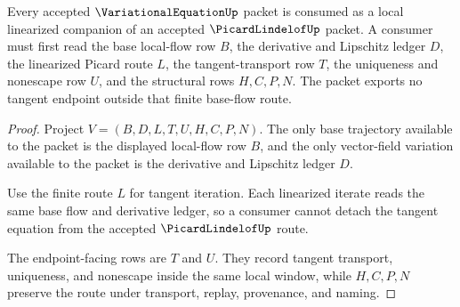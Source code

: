 \begin{theorem}
\label{thm:variational-equation-local-picard-companion-route}
Every accepted $\VariationalEquationUp$ packet is consumed as a local linearized companion of an accepted $\PicardLindelofUp$ packet. A consumer must first read the base local-flow row $B$, the derivative and Lipschitz ledger $D$, the linearized Picard route $L$, the tangent-transport row $T$, the uniqueness and nonescape row $U$, and the structural rows $H,C,P,N$. The packet exports no tangent endpoint outside that finite base-flow route.
\end{theorem}
\begin{proof}
Project $V=(B,D,L,T,U,H,C,P,N)$. The only base trajectory available to the packet is the displayed local-flow row $B$, and the only vector-field variation available to the packet is the derivative and Lipschitz ledger $D$.

Use the finite route $L$ for tangent iteration. Each linearized iterate reads the same base flow and derivative ledger, so a consumer cannot detach the tangent equation from the accepted $\PicardLindelofUp$ route.

The endpoint-facing rows are $T$ and $U$. They record tangent transport, uniqueness, and nonescape inside the same local window, while $H,C,P,N$ preserve the route under transport, replay, provenance, and naming.
\end{proof}




